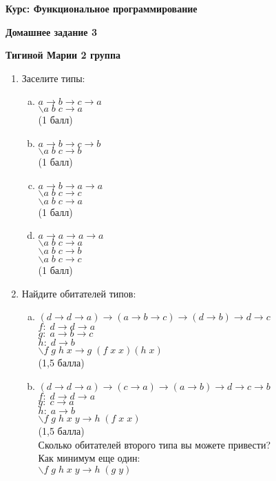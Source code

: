 \documentclass[10pt]{report}
\def\ar{\rightarrow}     %
\def\l{\backslash}       %
\newenvironment{MyList}[1][4pt]{
  \begin{enumerate}[1.]
  \setlength{\parskip}{0pt}
  \setlength{\itemsep}{#1}
}{       
  \end{enumerate}
}
\newenvironment{MyList}[1][4pt]{
  \begin{enumerate}[0.]
  \setlength{\parskip}{0pt}
  \setlength{\itemsep}{#1}
}{       
  \end{enumerate}
}
\begin{document}
\thispagestyle{empty}

\begin{center}
\textbf{Курс: Функциональное программирование}

\textbf{Домашнее задание 3}

\textbf{Тигиной Марии 2 группа}
\end{center}

\bigskip

\bigskip






\begin{MyList}[8pt]

\item Заселите типы:
\begin{enumerate}[a)]
\item $a \ar b \ar c \ar a$\\ 
$\l a\; b\; c \ar a$\\
(1 балл)
\item $a \ar b \ar c \ar b$\\
$\l a\; b\; c \ar b$\\
(1 балл)
\item $a \ar b \ar a \ar a$\\
$\l a\;b\;c \ar c$\\
$\l a\;b\;c \ar a$\\
(1 балл)
\item $a \ar a \ar a \ar a$\\
$\l a\;b\;c \ar a$\\
$\l a\;b\;c \ar b$\\
$\l a\;b\;c \ar c$\\
(1 балл)
\end{enumerate}

\item Найдите обитателей типов:
\begin{enumerate}[a)]
\item $(d  \ar d  \ar  a)  \ar  (a  \ar  b  \ar  c)  \ar  (d  \ar  b)  \ar  d  \ar  c$\\
$f :\;d  \ar d  \ar  a$\\
$g :\;a  \ar  b  \ar  c$\\
$h :\;d  \ar  b$\\
$\l f\;g\;h\;x \ar g\; (f\; x\; x) (h\;x)$\\
(1,5 балла)

\item $(d \ar d \ar a) \ar (c \ar a) \ar (a \ar b) \ar d \ar c \ar b$\\
$f :\;d  \ar d  \ar  a$\\
$g :\;c  \ar  a$\\
$h :\;a  \ar  b$\\
$\l f\;g\;h\;x\;y \ar h\; (f\; x\; x)$\\
(1,5 балла)\\
Сколько обитателей второго типа вы можете привести?\\
Как минимум еще один:\\
$\l f\;g\;h\;x\;y \ar h\; (g\; y)$\\
\end{enumerate}\\



\end{MyList}
\end{document}
